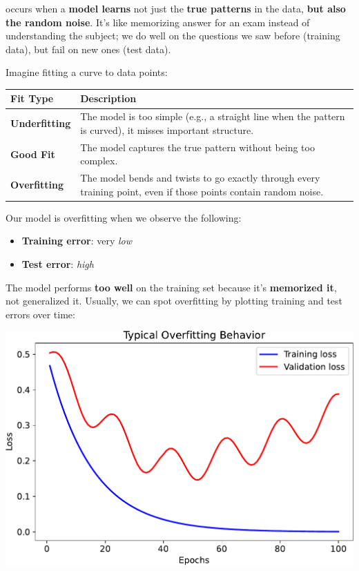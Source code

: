 \begin{remarkbox}\label{rmk:overfitting}
     occurs when a \textbf{model learns} not just the \textbf{true patterns} in the data, \textbf{but also the random noise}. It's like memorizing answer for an exam instead of understanding the subject; we do well on the questions we saw before (training data), but fail on new ones (test data).

    Imagine fitting a curve to data points:
    \begin{center}
        \begin{tabular}{@{} l | p{20em} @{}}
            \toprule
            Fit Type & Description \\
            \midrule
            \textbf{Underfitting}   & The model is too simple (e.g., a straight line when the pattern is curved), it misses important structure. \\ [.5em]
            \textbf{Good Fit}       & The model captures the true pattern without being too complex. \\ [.5em]
            \textbf{Overfitting}    & The model bends and twists to go exactly through every training point, even if those points contain random noise. \\
            \bottomrule
        \end{tabular}
    \end{center}

    \textcolor{Red2}{} Our model is overfitting when we observe the following:
    \begin{multicols}{2}
        \begin{itemize}
            \item \textbf{Training error}: very \emph{low}
            \item \textbf{Test error}: \emph{high}
        \end{itemize}
    \end{multicols}
    The model performs \textbf{too well} on the training set because it's \textbf{memorized it}, not generalized it. Usually, we can spot overfitting by plotting training and test errors over time:
    \begin{center}
        \includegraphics[width=.8\textwidth]{img/neural-networks-and-overfitting/overfitting.pdf}
    \end{center}
\end{remarkbox}

